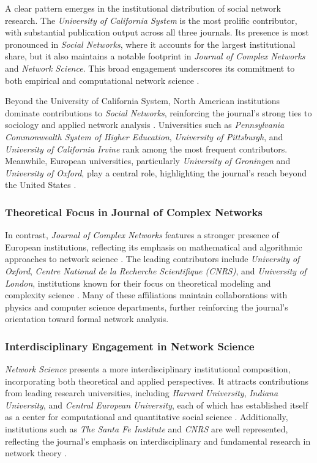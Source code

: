 \documentclass[twocolumn]{article}
\begin{document}
	A clear pattern emerges in the institutional distribution of social network research. The \textit{University of California System} is the most prolific contributor, with substantial publication output across all three journals. Its presence is most pronounced in \textit{Social Networks}, where it accounts for the largest institutional share, but it also maintains a notable footprint in \textit{Journal of Complex Networks} and \textit{Network Science}. This broad engagement underscores its commitment to both empirical and computational network science \cite{Leydesdorff2019}.
	
	Beyond the University of California System, North American institutions dominate contributions to \textit{Social Networks}, reinforcing the journal’s strong ties to sociology and applied network analysis \cite{Moody2004, Freeman2004}. Universities such as \textit{Pennsylvania Commonwealth System of Higher Education}, \textit{University of Pittsburgh}, and \textit{University of California Irvine} rank among the most frequent contributors. Meanwhile, European universities, particularly \textit{University of Groningen} and \textit{University of Oxford}, play a central role, highlighting the journal’s reach beyond the United States \cite{Borgatti2009}.
	
	\subsubsection*{Theoretical Focus in Journal of Complex Networks}
	
	In contrast, \textit{Journal of Complex Networks} features a stronger presence of European institutions, reflecting its emphasis on mathematical and algorithmic approaches to network science \cite{Newman2010}. The leading contributors include \textit{University of Oxford}, \textit{Centre National de la Recherche Scientifique (CNRS)}, and \textit{University of London}, institutions known for their focus on theoretical modeling and complexity science \cite{Barabasi2016}. Many of these affiliations maintain collaborations with physics and computer science departments, further reinforcing the journal’s orientation toward formal network analysis.
	
	\subsubsection*{Interdisciplinary Engagement in Network Science}
	
	\textit{Network Science} presents a more interdisciplinary institutional composition, incorporating both theoretical and applied perspectives. It attracts contributions from leading research universities, including \textit{Harvard University}, \textit{Indiana University}, and \textit{Central European University}, each of which has established itself as a center for computational and quantitative social science \cite{Fortunato2018}. Additionally, institutions such as \textit{The Santa Fe Institute} and \textit{CNRS} are well represented, reflecting the journal’s emphasis on interdisciplinary and fundamental research in network theory \cite{Boccaletti2014}.
	
\end{document}
